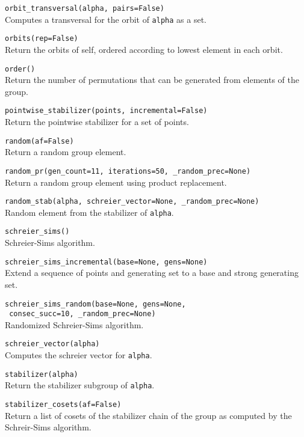 \documentclass[10pt,landscape]{article}
\begin{document}
\begin{multicols}{3}
\verb!orbit_transversal(alpha, pairs=False)!\\
Computes a transversal for the orbit of \verb!alpha! as a set.


\verb!orbits(rep=False)!\\
Return the orbits of self, ordered according to lowest element in each orbit.


\verb!order()!\\
Return the number of permutations that can be generated from elements of the group.



\verb!pointwise_stabilizer(points, incremental=False)!\\
Return the pointwise stabilizer for a set of points.



\verb!random(af=False)!\\
Return a random group element.



\verb!random_pr(gen_count=11, iterations=50, _random_prec=None)!\\
Return a random group element using product replacement.


\verb!random_stab(alpha, schreier_vector=None, _random_prec=None)!\\
Random element from the stabilizer of \verb!alpha!.


\verb!schreier_sims()!\\
Schreier-Sims algorithm.



\verb!schreier_sims_incremental(base=None, gens=None)!\\
Extend a sequence of points and generating set to a base and strong generating set.



\verb!schreier_sims_random(base=None, gens=None,!\\



\verb! consec_succ=10, _random_prec=None)!\\
Randomized Schreier-Sims algorithm.



\verb!schreier_vector(alpha)! \\
Computes the schreier vector for \verb!alpha!.


\verb!stabilizer(alpha)!\\
Return the stabilizer subgroup of \verb!alpha!.


\verb!stabilizer_cosets(af=False)!\\
Return a list of cosets of the stabilizer chain of the group as computed by the Schreir-Sims algorithm.




\end{multicols}
\end{document}
